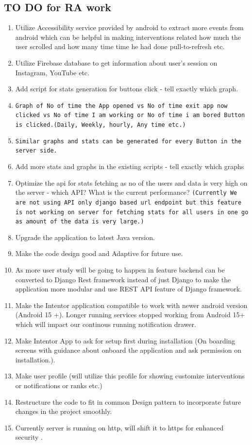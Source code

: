 \documentclass[12pt]{article}
\begin{document}
    \subsection{TO DO for RA work}
    \begin{enumerate}
        \item Utilize Accessibility service provided by android to extract more events from android which can be helpful in making interventions related how much the user scrolled and how many time time he had done pull-to-refresh etc.
        \item Utilize Firebase database to get information about user's session on Instagram, YouTube etc.
        \item Add script for stats generation for buttons click - tell exactly which graph. 
        \item \texttt{Graph of No of time the App opened vs No of time exit app now clicked vs No of time I am working or No of time i am bored Button is clicked.(Daily, Weekly, hourly, Any time etc.)}
        \item  \texttt{Similar graphs and stats can be generated for every Button  in the server side.}
        \item Add more stats and graphs in the existing scripts - tell exactly which graphs
        \item Optimize the api for stats fetching as no of the users and data is very high on the server - which API? What is the current performance? \texttt{(Currently We are not using API only django based url endpoint but this feature is not working on server for fetching stats for all users in one go as amount of the data is very large.)}
        \item Upgrade the application to latest Java version.
        \item Make the code design good and Adaptive for future use.
        \item As more user study will be going to happen in feature backend can be converted to Django Rest framework instead of just Django to make the application more modular and use REST API feature of Django framework.
        \item Make the Intentor application compatible to work with newer android version (Android 15 +). Longer running services stopped working from Android 15+ which will impact our continous running notification drawer. 
        \item Make Intentor App to ask for setup first during installation (On boarding screens with guidance about onboard the application and ask permission on installation.).
        \item Make user profile (will utilize this profile for showing customize interventions or notifications or ranks etc.)
        \item Restructure the code to fit in common Design pattern to incorporate future changes in the project smoothly.
        \item Currently server is running on http, will shift it to https for enhanced security .
    \end{enumerate}
\end{document}

